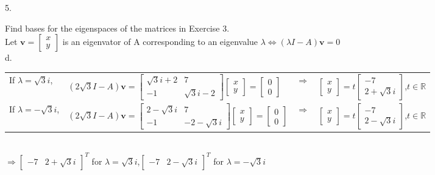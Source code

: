 \documentclass[12pt]{book}
\begin{document}
\begin{CJK}{UTF8}{bsmi}
5. \begin{minipage}[t]{\dimexpr\linewidth}
Find bases for the eigenspaces of the matrices in Exercise 3. \\
Let $\mathbf{v}=\begin{bmatrix} x \\ y \end{bmatrix}$ is an eigenvator of A corresponding to an eigenvalue $\lambda \Leftrightarrow (\lambda I-A)\mathbf{v}=0$ \\
d. \begin{minipage}[t]{\dimexpr\linewidth}
\begin{tabular}[t]{llll}
If $\lambda=\sqrt{3}i$,&$(2\sqrt{3}I-A)\mathbf{v}=\begin{bmatrix} \sqrt{3}i+2 & 7 \\ -1 & \sqrt{3}i-2 \end{bmatrix}\begin{bmatrix} x \\ y \end{bmatrix}=\begin{bmatrix} 0 \\ 0 \end{bmatrix}$&$\Rightarrow$&$\begin{bmatrix} x \\ y \end{bmatrix}=t\begin{bmatrix} -7 \\ 2+\sqrt{3}i \end{bmatrix}$,\quad$t\in\mathbb{R}$ \\
If $\lambda=-\sqrt{3}i$,&$(2\sqrt{3}I-A)\mathbf{v}=\begin{bmatrix} 2-\sqrt{3}i & 7 \\ -1 & -2-\sqrt{3}i \end{bmatrix}\begin{bmatrix} x \\ y \end{bmatrix}=\begin{bmatrix} 0 \\ 0 \end{bmatrix}$&$\Rightarrow$&$\begin{bmatrix} x \\ y \end{bmatrix}=t\begin{bmatrix} -7 \\ 2-\sqrt{3}i \end{bmatrix}$,\quad$t\in\mathbb{R}$ \\
\end{tabular} \\
$\Rightarrow \begin{bmatrix}-7 & 2+\sqrt{3}i\end{bmatrix}^T$ for $\lambda=\sqrt{3}i$,\quad$\begin{bmatrix}-7 & 2-\sqrt{3}i\end{bmatrix}^T$ for $\lambda=-\sqrt{3}i$
\end{minipage}
\end{minipage}\\


\end{CJK}
\end{document}
